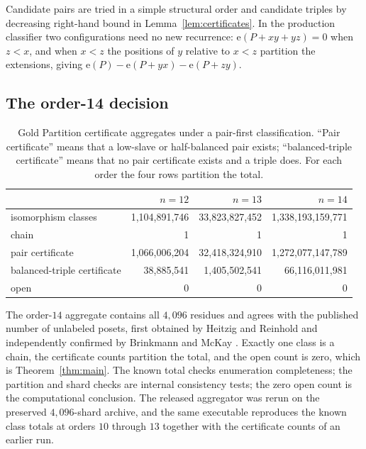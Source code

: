 \documentclass[11pt]{article}
\theoremstyle{definition}
\newcommand{\ext}{\mathrm{e}}
\begin{document}
Candidate pairs are tried in a simple structural order and candidate triples
by decreasing right-hand bound in Lemma~\ref{lem:certificates}.  In the
production classifier two configurations need no new recurrence:
$\ext(P+xy+yz)=0$ when $z<x$, and when $x<z$ the positions of $y$ relative to
$x<z$ partition the extensions, giving
$\ext(P)-\ext(P+yx)-\ext(P+zy)$.

\subsection{The order-14 decision}\label{sec:gpcresult}

\begin{table}[ht]
\centering
\begin{tabular}{lrrr}
\toprule
 & $n=12$ & $n=13$ & $n=14$\\
\midrule
isomorphism classes
 & 1{,}104{,}891{,}746
 & 33{,}823{,}827{,}452
 & 1{,}338{,}193{,}159{,}771\\
chain
 & 1 & 1 & 1\\
pair certificate
 & 1{,}066{,}006{,}204
 & 32{,}418{,}324{,}910
 & 1{,}272{,}077{,}147{,}789\\
balanced-triple certificate
 & 38{,}885{,}541
 & 1{,}405{,}502{,}541
 & 66{,}116{,}011{,}981\\
open
 & 0 & 0 & 0\\
\bottomrule
\end{tabular}
\caption{Gold Partition certificate aggregates under a pair-first
classification.  ``Pair certificate'' means that a low-slave or half-balanced
pair exists; ``balanced-triple certificate'' means that no pair certificate
exists and a triple does.  For each order the four rows partition the total.}
\label{tab:gpc}
\end{table}

The order-$14$ aggregate contains all $4{,}096$ residues and agrees with the
published number of unlabeled posets, first obtained by Heitzig and Reinhold
and independently confirmed by Brinkmann and McKay
\cite{heitzig-reinhold,brinkmann-mckay}.  Exactly one class is a chain, the
certificate counts partition the total, and the open count is zero, which is
Theorem~\ref{thm:main}.  The known total checks enumeration completeness; the
partition and shard checks are internal consistency tests; the zero open count
is the computational conclusion.  The released aggregator was rerun on the
preserved $4{,}096$-shard archive, and the same executable reproduces the
known class totals at orders $10$ through $13$ together with the certificate
counts of an earlier run.
\end{document}
